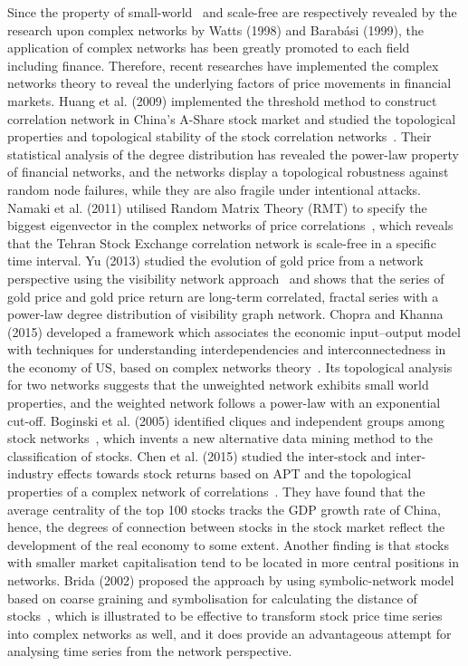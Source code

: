 Since the property of small-world~\cite{watts1998collective} and scale-free \cite{barabasi1999emergence} are respectively revealed by the research upon complex networks by Watts (1998) and Barab{\'a}si (1999), the application of complex networks has been greatly promoted to each field including finance. Therefore, recent researches have implemented the complex networks theory to reveal the underlying factors of price movements in financial markets. Huang et al. (2009) implemented the threshold method to construct correlation network in China's A-Share stock market and studied the topological properties and topological stability of the stock correlation networks~\cite{chinesenetwork}. Their statistical analysis of the degree distribution has revealed the power-law property of financial networks, and the networks display a topological robustness against random node failures, while they are also fragile under intentional attacks. Namaki et al. (2011) utilised Random Matrix Theory (RMT) to specify the biggest eigenvector in the complex networks of price correlations~\cite{genuine}, which reveals that the Tehran Stock Exchange correlation network is scale-free in a specific time interval. Yu (2013) studied the evolution of gold price from a network perspective using the visibility network approach~\cite{visibility} and shows that the series of gold price and gold price return are long-term correlated, fractal series with a power-law degree distribution of visibility graph network. Chopra and Khanna (2015) developed a framework which associates the economic input–output model with techniques for understanding interdependencies and interconnectedness in the economy of US, based on complex networks theory~\cite{intercd}. Its topological analysis for two networks suggests that the unweighted network exhibits small world properties, and the weighted network follows a power-law with an exponential cut-off. Boginski et al. (2005) identified cliques and independent groups among stock networks~\cite{statisticalanalysis}, which  invents a new alternative data mining method to the classification of stocks. Chen et al. (2015) studied the inter-stock and inter-industry effects towards stock returns based on APT and the topological properties of a complex network of correlations~\cite{CHEN2015224}. They have found that the average centrality of the top 100 stocks tracks the GDP growth rate of China, hence, the degrees of connection between stocks in the stock market reflect the development of the real economy to some extent. Another finding is that stocks with smaller market capitalisation tend to be located in more central positions in networks. Brida (2002) proposed the approach by using symbolic-network model based on coarse graining and symbolisation for calculating the distance of stocks~\cite{brida2002high}, which is illustrated to be effective to transform stock price time series into complex networks as well, and it does provide an advantageous attempt for analysing time series from the network perspective.


